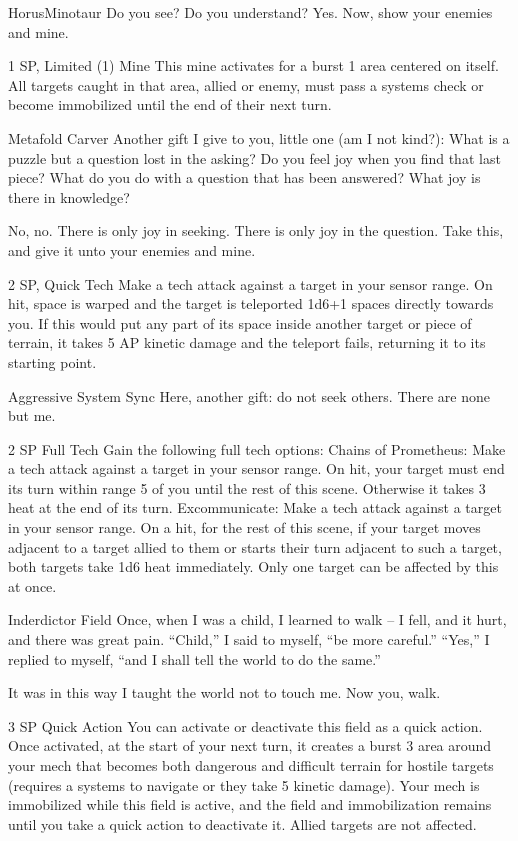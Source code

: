 \begin{mech}{Horus}{Minotaur}
Do you see? Do you understand? Yes. Now, show your enemies and mine.

1 SP, Limited (1)
Mine
This mine activates for a burst 1 area centered on itself. All targets caught in that area, allied or enemy, must pass a systems check or become immobilized until the end of their next turn.

Metafold Carver
Another gift I give to you, little one (am I not kind?): What is a puzzle but a question lost in the asking? Do you feel joy when you find that last piece? What do you do with a question that has been answered? What joy is there in knowledge?

No, no. There is only joy in seeking. There is only joy in the question. Take this, and give it unto your enemies and mine.

2 SP, Quick Tech
Make a tech attack against a target in your sensor range. On hit, space is warped and the target is teleported 1d6+1 spaces directly towards you. If this would put any part of its space inside another target or piece of terrain, it takes 5 AP kinetic damage and the teleport fails, returning it to its starting point.

Aggressive System Sync
Here, another gift: do not seek others. There are none but me.

2 SP
Full Tech
Gain the following full tech options:
Chains of Prometheus: Make a tech attack against a target in your sensor range. On hit, your target must end its turn within range 5 of you until the rest of this scene. Otherwise it takes 3 heat at the end of its turn.
Excommunicate: Make a tech attack against a target in your sensor range. On a hit, for the rest of this scene, if your target moves adjacent to a target allied to them or starts their turn adjacent to such a target, both targets take 1d6 heat immediately. Only one target can be affected by this at once.

Inderdictor Field
Once, when I was a child, I learned to walk  -- I fell, and it hurt, and there was great pain. “Child,” I said to myself, “be more careful.” “Yes,” I replied to myself, “and I shall tell the world to do the same.”

It was in this way I taught the world not to touch me. Now you, walk.

3 SP
Quick Action
You can activate or deactivate this field as a quick action. Once activated, at the start of your next turn, it creates a burst 3 area around your mech that becomes both dangerous and difficult terrain for hostile targets (requires a systems to navigate or they take 5 kinetic damage). Your mech is immobilized while this field is active, and the field and immobilization remains until you take a quick action to deactivate it. Allied targets are not affected.


\end{mech}
